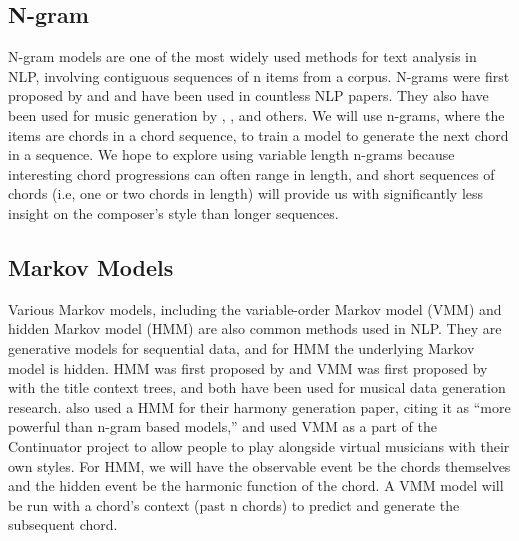 \documentclass[11pt,a4paper]{article}
\begin{document}
\subsection{N-gram}
N-gram models are one of the most widely used methods for text analysis in NLP, involving contiguous sequences of n items from a corpus. N-grams were first proposed by \citet{shannon1951} and \citet{miller1950} and have been used in countless NLP papers. They also have been used for music generation by \citet{ponsford1999}, \citet{ogihara2008}, and others. We will use n-grams, where the items are chords in a chord sequence, to train a model to generate the next chord in a sequence. We hope to explore using variable length n-grams because interesting chord progressions can often range in length, and short sequences of chords (i.e, one or two chords in length) will provide us with significantly less insight on the composer’s style than longer sequences. 

\subsection{Markov Models}
Various Markov models, including the variable-order Markov model (VMM) and hidden Markov model (HMM) are also common methods used in NLP. They are generative models for sequential data, and for HMM the underlying Markov model is hidden. HMM was first proposed by \citet{baum1966} and VMM was first proposed by \citet{rissanen1983} with the title context trees, and both have been used for musical data generation research. \citet{ponsford1999} also used a HMM for their harmony generation paper, citing it as “more powerful than n-gram based models,” and \citet{pachet2002} used VMM as a part of the Continuator project to allow people to play alongside virtual musicians with their own styles. For HMM, we will have the observable event be the chords themselves and the hidden event be the harmonic function of the chord. A VMM model will be run with a chord’s context (past n chords) to predict and generate the subsequent chord.  
\end{document}
